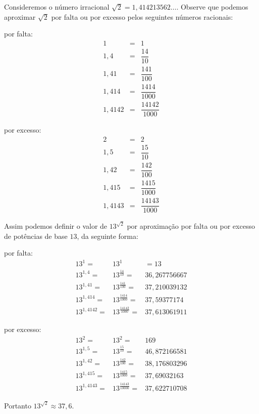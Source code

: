  \begin{exem}
 Consideremos o número irracional $\sqrt{2}= 1,414213562\ldots$. Observe que podemos aproximar $\sqrt{2}$ por falta ou por excesso pelos seguintes números racionais:

 \begin{multicols}{2}
 por falta:
 \begin{eqnarray*}
 1 &=& 1\\
 1,4 &=& \dfrac{14}{10} \\
 1,41 &=& \dfrac{141}{100} \\
 1,414 &=& \dfrac{1414}{1000} \\
 1,4142 &=& \dfrac{14142}{1000}
 \end{eqnarray*}

 por excesso:
 \begin{eqnarray*}
 2 &=& 2\\
 1,5 &=& \dfrac{15}{10} \\
 1,42 &=& \dfrac{142}{100} \\
 1,415 &=& \dfrac{1415}{1000} \\
 1,4143 &=& \dfrac{14143}{1000}
 \end{eqnarray*}
 \end{multicols}

 Assim podemos definir o valor de $13^{\sqrt{2}}$ por aproximação por falta ou por excesso de potências de base $13$, da seguinte forma:

 por falta:
 \begin{eqnarray*}
 13^1 =& 13^1 &= 13\\
 13^{1,4} =& 13^{\frac{14}{10}} =& 36,267756667 \\
 13^{1,41} =& 13^{\frac{141}{100}} =& 37,210039132 \\
 13^{1,414} =& 13^{\frac{1414}{1000}} =& 37,59377174 \\
 13^{1,4142} =& 13^{\frac{14142}{1000}} =& 37,613061911
 \end{eqnarray*}

 por excesso:
 \begin{eqnarray*}
 13^{2} =& 13^{2} =& 169 \\
 13^{1,5} =& 13^{\frac{15}{10}} =& 46,872166581 \\
 13^{1,42} =& 13^{\frac{142}{100}} =& 38,176803296\\
 13^{1,415} =& 13^{\frac{1415}{1000}} =& 37,69032163 \\
 13^{1,4143} =& 13^{\frac{14143}{10000}} =& 37,622710708
 \end{eqnarray*}

 Portanto $13^{\sqrt{2}} \approx 37,6$.
 \end{exem}

